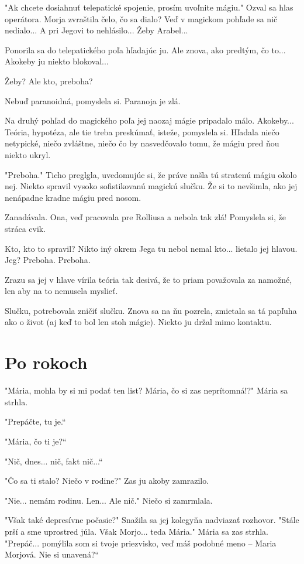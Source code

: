 \documentclass{book}
\begin{document}
"Ak chcete dosiahnuť telepatické spojenie, prosím uvoľnite mágiu." Ozval sa hlas operátora. Morja zvraštila čelo, čo sa dialo? Veď v magickom pohľade sa nič nedialo... A pri Jegovi to nehlásilo... Žeby Arabel...

Ponorila sa do telepatického poľa hľadajúc ju. Ale znova, ako predtým, čo to... Akokeby ju niekto blokoval...

Žeby? Ale kto, preboha?

Nebuď paranoidná, pomyslela si. Paranoja je zlá.

Na druhý pohľad do magického poľa jej naozaj mágie pripadalo málo. Akokeby... Teória, hypotéza, ale tie treba preskúmať, isteže, pomyslela si. Hľadala niečo netypické, niečo zvláštne, niečo čo by nasvedčovalo tomu, že mágiu pred ňou niekto ukryl.

"Preboha." Ticho preglgla, uvedomujúc si, že práve našla tú stratenú mágiu okolo nej. Niekto spravil vysoko sofistikovanú magickú slučku. Že si to nevšimla, ako jej nenápadne kradne mágiu pred nosom.

Zanadávala. Ona, veď pracovala pre Rolliusa a nebola tak zlá! Pomyslela si, že stráca cvik.

Kto, kto to spravil? Nikto iný okrem Jega tu nebol nemal kto... lietalo jej hlavou. Jeg? Preboha. Preboha.

Zrazu sa jej v hlave vírila teória tak desivá, že to priam považovala za namožné, len aby na to nemusela myslieť.

Slučku, potrebovala zničiť slučku. Znova sa na ňu pozrela, zmietala sa tá papľuha ako o život (aj keď to bol len stoh mágie). Niekto ju držal mimo kontaktu.


\newpage
\chapter{Po rokoch}

"Mária, mohla by si mi podať ten list? Mária, čo si zas neprítomná!?"$ $ Mária sa strhla.

"Prepáčte, tu je.“

"Mária, čo ti je?“

"Nič, dnes... nič, fakt nič...“

"Čo sa ti stalo? Niečo v rodine?"$ $ Zas ju akoby zamrazilo.

"Nie... nemám rodinu. Len... Ale nič."$ $ Niečo si zamrmlala.

"Však také depresívne počasie?"$ $ Snažila sa jej kolegyňa nadviazať rozhovor. "Stále prší a sme uprostred júla. Však Morjo... teda Mária."$ $ Mária sa zas strhla. "Prepáč... pomýlila som si tvoje priezvisko, veď máš podobné meno – Maria Morjová. Nie si unavená?“
\end{document}
